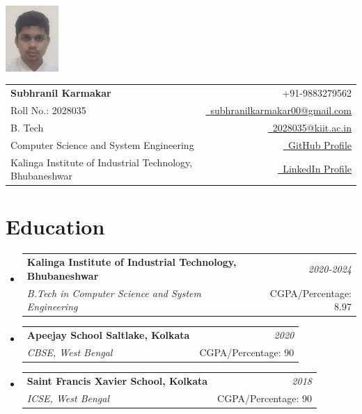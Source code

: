 \documentclass[a4paper,11pt]{article}
\makeatletter
\newcommand{\resumeSubheading}[4]{\vspace{0.5mm}\item
    \begin{tabular*}{0.98\textwidth}[t]{l@{\extracolsep{\fill}}r}
        \textbf{#1} & \textit{\footnotesize{#4}} \\
        \textit{\footnotesize{#3}} &  \footnotesize{#2}\\
    \end{tabular*}
    \vspace{-2.4mm}
}
\newcommand{\resumeSubHeadingListStart}{\begin{itemize}[leftmargin=*,labelsep=0mm]}
\newcommand{\resumeSubHeadingListEnd}{\end{itemize}\vspace{2mm}}
\newcommand{\name}{Subhranil Karmakar} %
\newcommand{\course}{B. Tech} %
\newcommand{\roll}{2028035} %
\newcommand{\phone}{9883279562} %
\newcommand{\emaila}{subhranilkarmakar00@gmail.com} %
\newcommand{\emailb}{2028035@kiit.ac.in} %
\makeatother
\begin{document}
\parbox{2.35cm}{%
\includegraphics[width=2cm,clip]{Passport Photo_Subhranil Karmakar c.jpeg}
}
\parbox{\dimexpr\linewidth-2.8cm\relax}{
\begin{tabularx}{\linewidth}{L r} \\
  \textbf{\Large \name} & {\raisebox{0.0\height}{\footnotesize \faPhone}\ +91-\phone}\\
  {Roll No.: \roll} & \href{mailto:\emaila}{\raisebox{0.0\height}{\footnotesize \faEnvelope}\ {\emaila}} \\
  \course &  \href{mailto:\emailb}{\raisebox{0.0\height}{\footnotesize \faEnvelope}\ {\emailb}}\\
  {Computer Science and System Engineering} &  \href{https://github.com/Subhranil2152}{\raisebox{0.0\height}{\footnotesize \faGithub}\ {GitHub Profile}} \\
  {Kalinga Institute of Industrial Technology, Bhubaneshwar} & \href{https://www.linkedin.com/in/subhranil-karmakar-526311200/}{\raisebox{0.0\height}{\footnotesize \faLinkedin}\ {LinkedIn Profile}}\\
  
\end{tabularx}
}

\section{\textbf{Education}}
\resumeSubHeadingListStart
    \resumeSubheading
      { Kalinga Institute of Industrial Technology, Bhubaneshwar}{CGPA/Percentage: 8.97}
      {B.Tech in Computer Science and System Engineering}{2020-2024}
    \resumeSubheading
      { Apeejay School Saltlake, Kolkata}{CGPA/Percentage: 90}
      {CBSE, West Bengal}{2020}
    \resumeSubheading
      { Saint Francis Xavier School, Kolkata}{CGPA/Percentage: 90}
      {ICSE, West Bengal}{2018}
\resumeSubHeadingListEnd
\vspace{-7mm}
\end{document}
